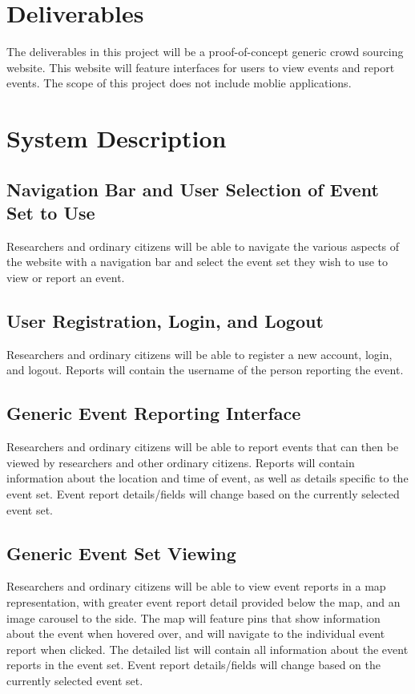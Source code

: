 \section{Deliverables}
The deliverables in this project will be a proof-of-concept generic crowd sourcing website. This website will feature interfaces for users to view events and report events. The scope of this project does not include moblie applications. 

\section{System Description}

\subsection{Navigation Bar and User Selection of Event Set to Use}
Researchers and ordinary citizens will be able to navigate the various aspects of the website with a navigation bar and select the event set they wish to use to view or report an event.

\subsection{User Registration, Login, and Logout}
Researchers and ordinary citizens will be able to register a new account, login, and logout. Reports will contain the username of the person reporting the event.

\subsection{Generic Event Reporting Interface}
Researchers and ordinary citizens will be able to report events that can then be viewed by researchers and other ordinary citizens. Reports will contain information about the location and time of event, as well as details specific to the event set. Event report details/fields will change based on the currently selected event set.

\subsection{Generic Event Set Viewing}
Researchers and ordinary citizens will be able to view event reports in a map representation, with greater event report detail provided below the map, and an image carousel to the side. The map will feature pins that show information about the event when hovered over, and will navigate to the individual event report when clicked. The detailed list will contain all information about the event reports in the event set. Event report details/fields will change based on the currently selected event set.

